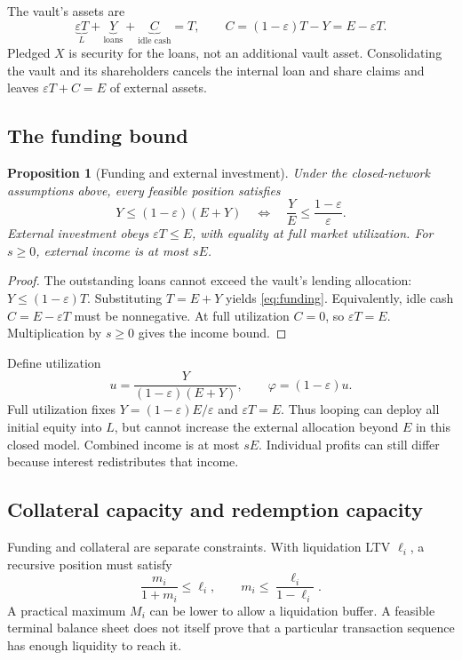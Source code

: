 \documentclass[12pt,oneside]{article}
\newtheorem{proposition}{Proposition}
\begin{document}
The vault's assets are
\[
 \underbrace{\varepsilon T}_{L}
 +\underbrace{Y}_{\text{loans}}
 +\underbrace{C}_{\text{idle cash}}=T,
 \qquad C=(1-\varepsilon)T-Y=E-\varepsilon T.
\]
Pledged $X$ is security for the loans, not an additional vault asset.
Consolidating the vault and its shareholders cancels the internal loan
and share claims and leaves $\varepsilon T+C=E$ of external assets.

\subsection{The funding bound}
\begin{proposition}[Funding and external investment]
\label{prop:funding}
Under the closed-network assumptions above, every feasible position
satisfies
\begin{equation}
 Y\leq(1-\varepsilon)(E+Y)
 \quad\Longleftrightarrow\quad
 \frac{Y}{E}\leq\frac{1-\varepsilon}{\varepsilon}.
 \label{eq:funding}
\end{equation}
External investment obeys $\varepsilon T\leq E$, with equality at full
market utilization. For $s\geq0$, external income is at most $sE$.
\end{proposition}
\begin{proof}
The outstanding loans cannot exceed the vault's lending allocation:
$Y\leq(1-\varepsilon)T$. Substituting $T=E+Y$ yields
\eqref{eq:funding}. Equivalently, idle cash
$C=E-\varepsilon T$ must be nonnegative. At full utilization $C=0$,
so $\varepsilon T=E$. Multiplication by $s\geq0$ gives the income
bound.
\end{proof}
Define utilization
\[
 u=\frac{Y}{(1-\varepsilon)(E+Y)},\qquad
 \varphi=(1-\varepsilon)u.
\]
Full utilization fixes $Y=(1-\varepsilon)E/\varepsilon$ and
$\varepsilon T=E$. Thus looping can deploy all initial equity into
$L$, but cannot increase the external allocation beyond $E$ in this
closed model. Combined income is at most $sE$. Individual profits can
still differ because interest redistributes that income.

\subsection{Collateral capacity and redemption capacity}
Funding and collateral are separate constraints. With liquidation LTV
$\ell_i$, a recursive position must satisfy
\[
 \frac{m_i}{1+m_i}\leq\ell_i,
 \qquad m_i\leq\frac{\ell_i}{1-\ell_i}.
\]
A practical maximum $M_i$ can be lower to allow a liquidation buffer.
A feasible terminal balance sheet does not itself prove that a
particular transaction sequence has enough liquidity to reach it.
\end{document}
